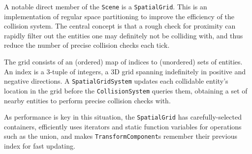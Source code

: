 \documentclass[a4paper, oneside, 11pt]{report}
\begin{document}
A notable direct member of the \texttt{Scene} is a \texttt{SpatialGrid}. This is an implementation of regular space partitioning to improve the efficiency of the collision system. The central concept is that a rough check for proximity can rapidly filter out the entities one may definitely not be colliding with, and thus reduce the number of precise collision checks each tick.

The grid consists of an (ordered) map of indices to (unordered) sets of entities. An index is a 3-tuple of integers, a 3D grid spanning indefinitely in positive and negative directions. A \texttt{SpatialGridSystem} updates each collidable entity's location in the grid before the \texttt{CollisionSystem} queries them, obtaining a set of nearby entities to perform precise collision checks with.

As performance is key in this situation, the \texttt{SpatialGrid} has carefully-selected containers, efficiently uses iterators and static function variables for operations such as the union, and makes \texttt{TransformComponent}s remember their previous index for fast updating.
\end{document}

